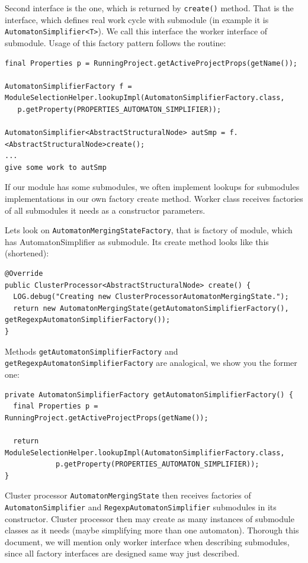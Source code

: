 \documentclass[a4paper,10pt,oneside]{article}
\newcommand{\code}[1]{\texttt{#1}}
\begin{document}
Second interface is the one, which is returned by \code{create()} method.
That is the interface, which defines real work cycle with submodule (in example it is \code{AutomatonSimplifier<T>}).
We call this interface the worker interface of submodule.
Usage of this factory pattern follows the routine:
\begin{verbatim}
final Properties p = RunningProject.getActiveProjectProps(getName());

AutomatonSimplifierFactory f = ModuleSelectionHelper.lookupImpl(AutomatonSimplifierFactory.class,
   p.getProperty(PROPERTIES_AUTOMATON_SIMPLIFIER));

AutomatonSimplifier<AbstractStructuralNode> autSmp = f.<AbstractStructuralNode>create();
...
give some work to autSmp
\end{verbatim}
If our module has some submodules, we often implement lookups for submodules implementations in our own factory create method.
Worker class receives factories of all submodules it needs as a constructor parameters.

Lets look on \code{AutomatonMergingStateFactory}, that is factory of module, which has AutomatonSimplifier as submodule.
Its create method looks like this (shortened): 
\begin{verbatim}
@Override
public ClusterProcessor<AbstractStructuralNode> create() {
  LOG.debug("Creating new ClusterProcessorAutomatonMergingState.");
  return new AutomatonMergingState(getAutomatonSimplifierFactory(), getRegexpAutomatonSimplifierFactory());
}
\end{verbatim}
Methods \code{getAutomatonSimplifierFactory} and \code{getRegexpAutomatonSimplifierFactory} are analogical, we show you the former one:
\begin{verbatim}
private AutomatonSimplifierFactory getAutomatonSimplifierFactory() {
  final Properties p = RunningProject.getActiveProjectProps(getName());

  return ModuleSelectionHelper.lookupImpl(AutomatonSimplifierFactory.class,
            p.getProperty(PROPERTIES_AUTOMATON_SIMPLIFIER));
}
\end{verbatim}
Cluster processor \code{AutomatonMergingState} then receives factories of \code{AutomatonSimplifier} and \code{RegexpAutomatonSimplifier} submodules in its constructor.
Cluster processor then may create as many instances of submodule classes as it needs (maybe simplifying more than one automaton).
Thorough this document, we will mention only worker interface when describing submodules, since all factory interfaces are designed same way just described.
\end{document}
